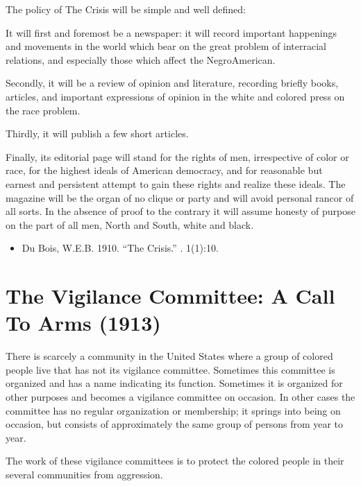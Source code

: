 \documentclass[letterpaper,10pt,english]{jupyterBook}
\begin{document}
\sphinxAtStartPar
The policy of The Crisis will be simple and well defined:

\sphinxAtStartPar
It will first and foremost be a newspaper: it will record important happenings and movements in the world which bear on the great problem of inter\sphinxhyphen{}racial relations, and especially those which affect the Negro\sphinxhyphen{}American.

\sphinxAtStartPar
Secondly, it will be a review of opinion and literature, recording briefly books, articles, and important expressions of opinion in the white and colored press on the race problem.

\sphinxAtStartPar
Thirdly, it will publish a few short articles.

\sphinxAtStartPar
Finally, its editorial page will stand for the rights of men, irrespective of color or race, for the highest ideals of American democracy, and for reasonable but earnest and persistent attempt to gain these rights and realize these ideals. The magazine will be the organ of no clique or party and will avoid personal rancor of all sorts. In the absence of proof to the contrary it will assume honesty of purpose on the part of all men, North and South, white and black.
\begin{itemize}
\item {} 
\sphinxAtStartPar
Du Bois, W.E.B. 1910. “The Crisis.” . 1(1):10.

\end{itemize}


\section{The Vigilance Committee: A Call To Arms (1913)}
\label{\detokenize{Volumes/06/01/vigilance_committee:the-vigilance-committee-a-call-to-arms-1913}}\label{\detokenize{Volumes/06/01/vigilance_committee::doc}}
\sphinxAtStartPar
There is scarcely a community in the United States where a group of colored people live that has not its vigilance committee. Sometimes this committee is organized and has a name indicating its function. Sometimes it is organized for other purposes and becomes a vigilance committee on occasion. In other cases the committee has no regular organization or membership; it springs into being on occasion, but consists of approximately the same group of persons from year to year.

\sphinxAtStartPar
The work of these vigilance committees is to protect the colored people in their several communities from aggression.
\end{document}
